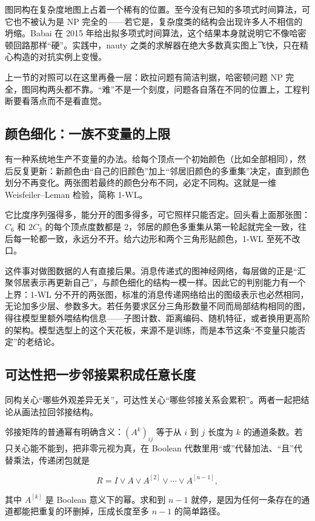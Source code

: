 图同构在复杂度地图上占着一个稀有的位置。至今没有已知的多项式时间算法，可它也不被认为是 NP 完全的——若它是，复杂度类的结构会出现许多人不相信的坍缩。Babai 在 2015 年给出拟多项式时间算法，这个结果本身就说明它不像哈密顿回路那样``硬''。实践中，nauty 之类的求解器在绝大多数真实图上飞快，只在精心构造的对抗实例上变慢。

上一节的对照可以在这里再叠一层：欧拉问题有简洁判据，哈密顿问题 NP 完全，图同构两头都不靠。``难''不是一个刻度，问题各自落在不同的位置上，工程判断要看落点而不是看直觉。

\subsection{颜色细化：一族不变量的上限}

有一种系统地生产不变量的办法。给每个顶点一个初始颜色（比如全部相同），然后反复更新：新颜色由``自己的旧颜色''加上``邻居旧颜色的多重集''决定，直到颜色划分不再变化。两张图若最终的颜色分布不同，必定不同构。这就是一维 Weisfeiler--Leman 检验，简称 1-WL。

它比度序列强得多，能分开的图多得多，可它照样只能否定。回头看上面那张图：\(C_6\) 和 \(2C_3\) 的每个顶点度数都是 2，邻居的颜色多重集从第一轮起就完全一致，往后每一轮都一致，永远分不开。给六边形和两个三角形贴颜色，1-WL 至死不改口。

这件事对做图数据的人有直接后果。消息传递式的图神经网络，每层做的正是``汇聚邻居表示再更新自己''，与颜色细化的结构一模一样。因此它的判别能力有一个上界：1-WL 分不开的两张图，标准的消息传递网络给出的图级表示也必然相同，无论加多少层、参数多大。若任务要求区分三角形数量不同而局部结构相同的图，得往模型里额外喂结构信息——子图计数、距离编码、随机特征，或者换用更高阶的架构。模型选型上的这个天花板，来源不是训练，而是本节这条``不变量只能否定''的老结论。

\subsection{可达性把一步邻接累积成任意长度}

同构关心``哪些外观差异无关''，可达性关心``哪些邻接关系会累积''。两者一起把结论从画法拉回邻接结构。

邻接矩阵的普通幂有明确含义：\((A^{k})_{ij}\) 等于从 \(i\) 到 \(j\) 长度为 \(k\) 的通道条数。若只关心能不能到，把非零元视为真，在 Boolean 代数里用``或''代替加法、``且''代替乘法，传递闭包就是

\[
R=I\lor A\lor A^{[2]}\lor\cdots\lor A^{[n-1]},
\]

其中 \(A^{[k]}\) 是 Boolean 意义下的幂。求和到 \(n-1\) 就停，是因为任何一条存在的通道都能把重复的环删掉，压成长度至多 \(n-1\) 的简单路径。


